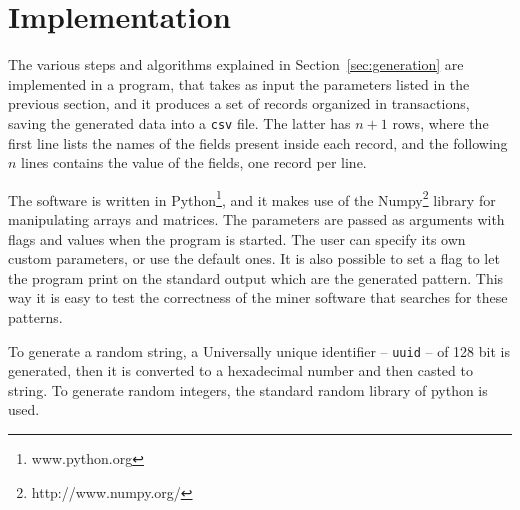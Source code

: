 \documentclass{acm_proc_article-sp-sigmod09}
\begin{document}
\section{Implementation}
The various steps and algorithms explained in Section~\ref{sec:generation} are implemented in a program, that takes as input the parameters listed in the previous section, and it produces a set of records organized in transactions, saving the generated data into a \texttt{csv} file. The latter has $n + 1$ rows, where the first line lists the names of the fields present inside each record, and the following $n$ lines contains the value of the fields, one record per line.

The software is written in Python\footnote{www.python.org}, and it makes use of the Numpy\footnote{http://www.numpy.org/} library \cite{oliphant2006guide} for manipulating arrays and matrices. The parameters are passed as arguments with flags and values when the program is started. The user can specify its own custom parameters, or use the default ones. It is also possible to set a flag to let the program print on the standard output which are the generated pattern. This way it is easy to test the correctness of the miner software that searches for these patterns.

To generate a random string, a Universally unique identifier -- \texttt{uuid} -- of 128 bit is generated, then it is converted to a hexadecimal number and then casted to string. To generate random integers, the standard random library of python is used.
\end{document}
